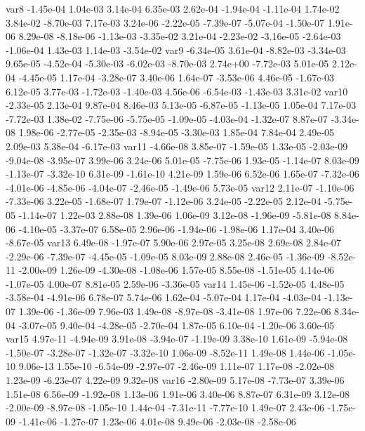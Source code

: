 var8 -1.45e-04  1.04e-03  3.14e-04  6.35e-03  2.62e-04 -1.94e-04 -1.11e-04  1.74e-02  3.84e-02 -8.70e-03  7.17e-03  3.24e-06 -2.22e-05 -7.39e-07 -5.07e-04 -1.50e-07  1.91e-06  8.29e-08 -8.18e-06 -1.13e-03 -3.35e-02  3.21e-04 -2.23e-02 -3.16e-05 -2.64e-03 -1.06e-04  1.43e-03  1.14e-03 -3.54e-02
var9 -6.34e-05  3.61e-04 -8.82e-03 -3.34e-03  9.65e-05 -4.52e-04 -5.30e-03 -6.02e-03 -8.70e-03  2.74e+00 -7.72e-03  5.01e-05  2.12e-04 -4.45e-05  1.17e-04 -3.28e-07  3.40e-06  1.64e-07 -3.53e-06  4.46e-05 -1.67e-03  6.12e-05  3.77e-03 -1.72e-03 -1.40e-03  4.56e-06 -6.54e-03 -1.43e-03  3.31e-02
var10 -2.33e-05  2.13e-04  9.87e-04  8.46e-03  5.13e-05 -6.87e-05 -1.13e-05  1.05e-04  7.17e-03 -7.72e-03  1.38e-02 -7.75e-06 -5.75e-05 -1.09e-05 -4.03e-04 -1.32e-07  8.87e-07 -3.34e-08  1.98e-06 -2.77e-05 -2.35e-03 -8.94e-05 -3.30e-03  1.85e-04  7.84e-04  2.49e-05  2.09e-03  5.38e-04 -6.17e-03
var11 -4.66e-08  3.85e-07 -1.59e-05  1.33e-05 -2.03e-09 -9.04e-08 -3.95e-07  3.99e-06  3.24e-06  5.01e-05 -7.75e-06  1.93e-05 -1.14e-07  8.03e-09 -1.13e-07 -3.32e-10  6.31e-09 -1.61e-10  4.21e-09  1.59e-06  6.52e-06  1.65e-07 -7.32e-06 -4.01e-06 -4.85e-06 -4.04e-07 -2.46e-05 -1.49e-06  5.73e-05
var12  2.11e-07 -1.10e-06 -7.33e-06  3.22e-05 -1.68e-07  1.79e-07 -1.12e-06  3.24e-05 -2.22e-05  2.12e-04 -5.75e-05 -1.14e-07  1.22e-03  2.88e-08  1.39e-06  1.06e-09  3.12e-08 -1.96e-09 -5.81e-08  8.84e-06 -4.10e-05 -3.37e-07  6.58e-05  2.96e-06 -1.94e-06 -1.98e-06  1.17e-04  3.40e-06 -8.67e-05
var13  6.49e-08 -1.97e-07  5.90e-06  2.97e-05  3.25e-08  2.69e-08  2.84e-07 -2.29e-06 -7.39e-07 -4.45e-05 -1.09e-05  8.03e-09  2.88e-08  2.46e-05 -1.36e-09 -8.52e-11 -2.00e-09  1.26e-09 -4.30e-08 -1.08e-06  1.57e-05  8.55e-08 -1.51e-05  4.14e-06 -1.07e-05  4.00e-07  8.81e-05  2.59e-06 -3.36e-05
var14  1.45e-06 -1.52e-05  4.48e-05 -3.58e-04 -4.91e-06  6.78e-07  5.74e-06  1.62e-04 -5.07e-04  1.17e-04 -4.03e-04 -1.13e-07  1.39e-06 -1.36e-09  7.96e-03  1.49e-08 -8.97e-08 -3.41e-08  1.97e-06  7.22e-06  8.34e-04 -3.07e-05  9.40e-04 -4.28e-05 -2.70e-04  1.87e-05  6.10e-04 -1.20e-06  3.60e-05
var15  4.97e-11 -4.94e-09  3.91e-08 -3.94e-07 -1.19e-09  3.38e-10  1.61e-09 -5.94e-08 -1.50e-07 -3.28e-07 -1.32e-07 -3.32e-10  1.06e-09 -8.52e-11  1.49e-08  1.44e-06 -1.05e-10  9.06e-13  1.55e-10 -6.54e-09 -2.97e-07 -2.46e-09  1.11e-07  1.17e-08 -2.02e-08  1.23e-09 -6.23e-07  4.22e-09  9.32e-08
var16 -2.80e-09  5.17e-08 -7.73e-07  3.39e-06  1.51e-08  6.56e-09 -1.92e-08  1.13e-06  1.91e-06  3.40e-06  8.87e-07  6.31e-09  3.12e-08 -2.00e-09 -8.97e-08 -1.05e-10  1.44e-04 -7.31e-11 -7.77e-10  1.49e-07  2.43e-06 -1.75e-09 -1.41e-06 -1.27e-07  1.23e-06  4.01e-08  9.49e-06 -2.03e-08 -2.58e-06
